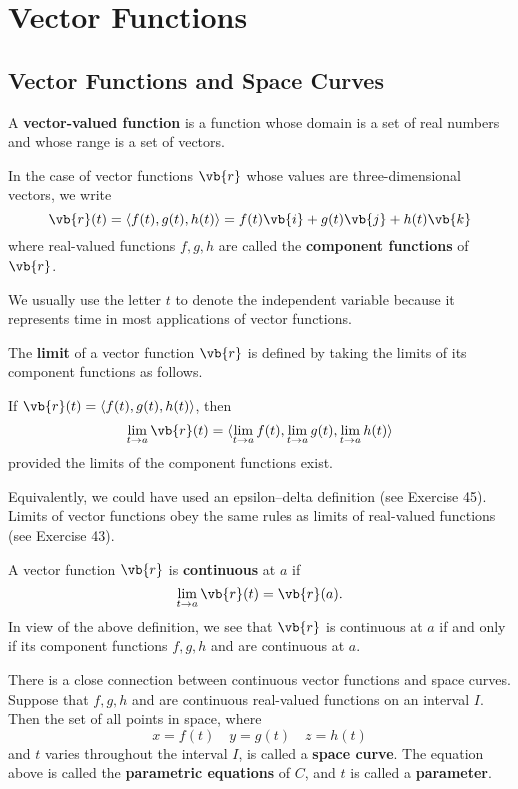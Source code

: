 \chapter{Vector Functions}
\section{Vector Functions and Space Curves}
A \textbf{vector-valued function} is a function whose domain is a set of real numbers and whose range is a set of vectors.

In the case of vector functions $\vb{r}$ whose values are three-dimensional vectors, we write
\[\vb{r}(t)=\langle f(t),g(t),h(t)\rangle=f(t)\vb{i}+g(t)\vb{j}+h(t)\vb{k}\]
where real-valued functions $f,g,h$ are called the \textbf{component functions} of $\vb{r}$.

\begin{remark}
We usually use the letter $t$ to denote the independent variable because it represents time in most applications of vector functions.
\end{remark}

The \textbf{limit} of a vector function $\vb{r}$ is defined by taking the limits of its component functions as follows.

\begin{definition}[Limit]
If $\vb{r}(t)=\langle f(t),g(t),h(t)\rangle$, then
\[\lim_{t\to a}\vb{r}(t)=\langle\lim_{t\to a}f(t),\lim_{t\to a}g(t),\lim_{t\to a}h(t)\rangle\]
provided the limits of the component functions exist.
\end{definition}

Equivalently, we could have used an epsilon--delta definition (see Exercise 45). Limits of vector functions obey the same rules as limits of real-valued functions (see Exercise 43).

A vector function $\vb{r}$ is \textbf{continuous} at $a$ if
\[\lim_{t\to a}\vb{r}(t)=\vb{r}(a).\]
In view of the above definition, we see that $\vb{r}$ is continuous at $a$ if and only if its component functions $f,g,h$ and are continuous at $a$.

There is a close connection between continuous vector functions and space curves. Suppose that $f,g,h$ and are continuous real-valued functions on an interval $I$. Then the set of all points in space, where
\[x=f(t)\quad y=g(t)\quad z=h(t)\]
and $t$ varies throughout the interval $I$, is called a \textbf{space curve}. The equation above is called the \textbf{parametric equations} of $C$, and $t$ is called a \textbf{parameter}.

